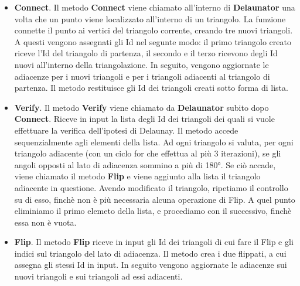 \documentclass{article}
\begin{document}
\begin{itemize}
\item \textbf{Connect}. Il metodo \textbf{Connect} viene chiamato all'interno di \textbf{Delaunator} una volta che un punto viene localizzato all'interno di un triangolo.  La funzione connette il punto ai vertici del triangolo corrente,  creando tre nuovi triangoli.  A questi vengono assegnati gli Id nel segunte modo: il primo triangolo creato riceve l'Id del triangolo di partenza, il secondo e il terzo ricevono degli Id nuovi all'interno della triangolazione. In seguito, vengono aggiornate le adiacenze per i nuovi triangoli e per i triangoli adiacenti al triangolo di partenza.  Il metodo restituisce gli Id dei triangoli creati sotto forma di lista.

\item \textbf{Verify}. Il metodo \textbf{Verify} viene chiamato da \textbf{Delaunator} subito dopo \textbf{Connect}.  Riceve in input la lista degli Id dei triangoli dei quali si vuole effettuare la verifica dell'ipotesi di Delaunay.  Il metodo accede sequenzialmente agli elementi della lista.  Ad ogni triangolo si valuta, per ogni triangolo adiacente (con un ciclo for che effettua al più 3 iterazioni),  se gli angoli opposti al lato di adiacenza sommino a più di 180°.  Se ciò accade, viene chiamato il metodo \textbf{Flip} e viene aggiunto alla lista il triangolo adiacente in questione. Avendo modificato il triangolo, ripetiamo il controllo su di esso, finchè non è più necessaria alcuna operazione di Flip. A quel punto eliminiamo il primo elemeto della lista, e procediamo con il successivo, finchè essa non è vuota.

\item \textbf{Flip}. Il metodo \textbf{Flip} riceve in input gli Id dei triangoli di cui fare il Flip e gli indici sul triangolo del lato di adiacenza.  Il metodo crea i due flippati, a cui assegna gli stessi Id in input.  In seguito vengono aggiornate le adiacenze sui nuovi triangoli e sui triangoli ad essi adiacenti.

\end{itemize}
\end{document}
